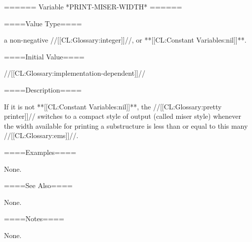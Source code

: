 ====== Variable *PRINT-MISER-WIDTH* ======

====Value Type====

a non-negative //[[CL:Glossary:integer]]//, or **[[CL:Constant Variables:nil]]**.

====Initial Value====

//[[CL:Glossary:implementation-dependent]]//

====Description====

If it is not **[[CL:Constant Variables:nil]]**, the //[[CL:Glossary:pretty printer]]// switches to a compact style of output (called miser style) whenever the width available for printing a substructure is less than or equal to this many //[[CL:Glossary:ems]]//.

====Examples====

None.

====See Also====

None.

====Notes====

None.

